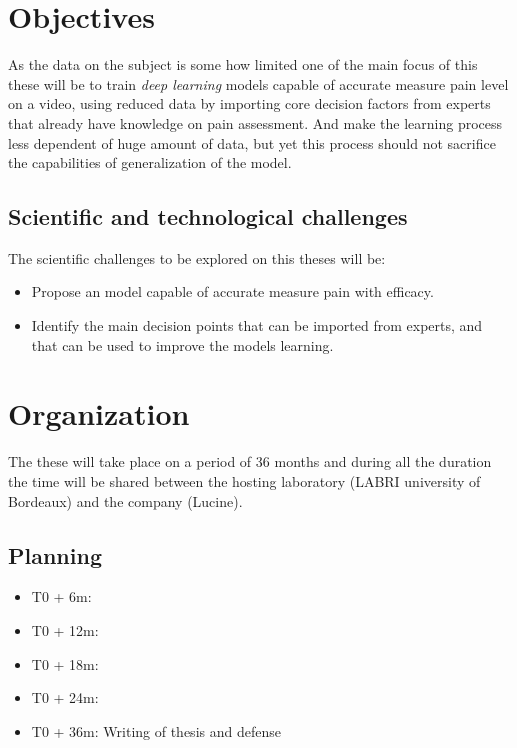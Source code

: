 \documentclass[11pt]{article}
\begin{document}
\section{Objectives}
\label{sec:org4c0a91d}
As the data on the subject is some how limited one of the main focus of this
these will be to train \emph{deep learning} models capable of accurate measure pain
level on a video, using reduced data by importing core decision factors from
experts that already have knowledge on pain assessment.
And make the learning process less dependent of huge amount of data, but yet
this process should not sacrifice the capabilities of generalization of the
model.

\subsection{Scientific and technological challenges}
\label{sec:org5e5ac54}
The scientific challenges to be explored on this theses will be:
\begin{itemize}
\item Propose an model capable of accurate measure pain with efficacy.
\item Identify the main decision points that can be imported from experts, and
that can be used to improve the models learning.
\end{itemize}


\section{Organization}
\label{sec:org4ca33dd}
The these will take place on a period of 36 months and during all the duration
the time will be shared between the hosting laboratory (LABRI university of
Bordeaux) and the company (Lucine).

\subsection{Planning}
\label{sec:orgf531699}
\begin{itemize}
\item T0 + 6m:
\item T0 + 12m:
\item T0 + 18m:
\item T0 + 24m:
\item T0 + 36m: Writing of thesis and defense
\end{itemize}





\end{document}
